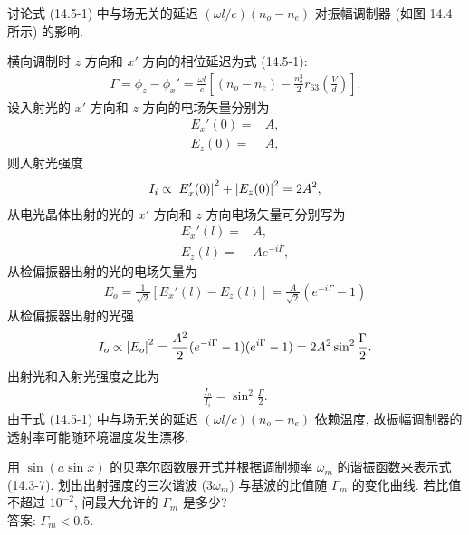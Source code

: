 \documentclass{note}
\begin{document}
\begin{exe}
    讨论式 (14.5-1) 中与场无关的延迟 $(\omega l/c)(n_o-n_e)$ 对振幅调制器 (如图 14.4 所示) 的影响.
\end{exe}
\begin{sol}
    横向调制时 $z$ 方向和 $x'$ 方向的相位延迟为式 (14.5-1):
    \begin{align}
        \Gamma=\phi_z-\phi_x'=\frac{\omega l}{c}\left[(n_o-n_e)-\frac{n_o^3}{2}r_{63}\left(\frac{V}{d}\right)\right].
    \end{align}
    设入射光的 $x'$ 方向和 $z$ 方向的电场矢量分别为
    \begin{align}
        E_x'(0)=&A,\\
        E_z(0)=&A,
    \end{align}
    则入射光强度
    \begin{align}
        I_i\propto\left\lvert E_x'(0)\right\rvert^2+\left\lvert E_z(0)\right\rvert^2=2A^2,
    \end{align}
    从电光晶体出射的光的 $x'$ 方向和 $z$ 方向电场矢量可分别写为
    \begin{align}
        E_x'(l)=&A,\\
        E_z(l)=&Ae^{-i\Gamma},
    \end{align}
    从检偏振器出射的光的电场矢量为
    \begin{align}
        E_o=\frac{1}{\sqrt{2}}[E_x'(l)-E_z(l)]=\frac{A}{\sqrt{2}}(e^{-i\Gamma}-1)
    \end{align}
    从检偏振器出射的光强
    \begin{align}
        I_o\propto\left\lvert E_o\right\rvert^2=\frac{A^2}{2}(e^{-i\Gamma}-1)(e^{i\Gamma}-1)=2A^2\sin^2\frac{\Gamma}{2}.
    \end{align}
    出射光和入射光强度之比为
    \begin{align}
        \frac{I_o}{I_i}=\sin^2\frac{\Gamma}{2}.
    \end{align}
    由于式 (14.5-1) 中与场无关的延迟 $(\omega l/c)(n_o-n_e)$ 依赖温度, 故振幅调制器的透射率可能随环境温度发生漂移.
\end{sol}

\begin{exe}
    用 $\sin(a\sin x)$ 的贝塞尔函数展开式并根据调制频率 $\omega_m$ 的谐振函数来表示式 (14.3-7). 划出出射强度的三次谐波 ($3\omega_m$) 与基波的比值随 $\Gamma_m$ 的变化曲线. 若比值不超过 $10^{-2}$, 问最大允许的 $\Gamma_m$ 是多少?\\
    答案: $\Gamma_m<0.5$.
\end{exe}
\begin{sol}
    
\end{sol}
\end{document}

